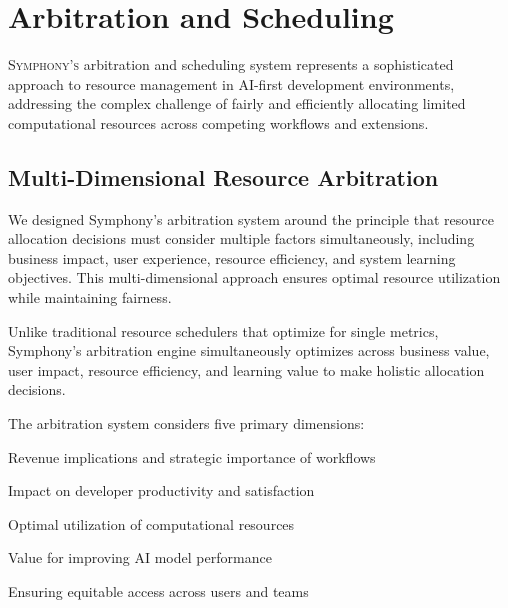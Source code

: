 
\section*{Arbitration and Scheduling}

\vspace{0.5cm}
\lettrine{S}{ymphony's} arbitration and scheduling system represents a sophisticated approach to resource management in AI-first development environments, addressing the complex challenge of fairly and efficiently allocating limited computational resources across competing workflows and extensions.

\subsection*{Multi-Dimensional Resource Arbitration}

We designed Symphony's arbitration system around the principle that resource allocation decisions must consider multiple factors simultaneously, including business impact, user experience, resource efficiency, and system learning objectives. This multi-dimensional approach ensures optimal resource utilization while maintaining fairness.

\begin{infobox}[title=Multi-Dimensional Optimization]
Unlike traditional resource schedulers that optimize for single metrics, Symphony's arbitration engine simultaneously optimizes across business value, user impact, resource efficiency, and learning value to make holistic allocation decisions.
\end{infobox}

The arbitration system considers five primary dimensions:

\begin{description}[leftmargin=4cm,labelwidth=3.5cm]
    \item[\textbf{Business Impact}] Revenue implications and strategic importance of workflows
    \item[\textbf{User Experience}] Impact on developer productivity and satisfaction
    \item[\textbf{Resource Efficiency}] Optimal utilization of computational resources
    \item[\textbf{System Learning}] Value for improving AI model performance
    \item[\textbf{Fairness Constraints}] Ensuring equitable access across users and teams
\end{description}

